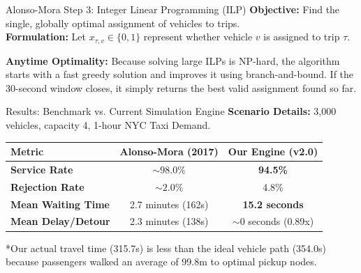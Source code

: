 \documentclass{beamer}
\begin{document}
\begin{frame}{Alonso-Mora Step 3: Integer Linear Programming (ILP)}
  \textbf{Objective:} Find the single, globally optimal assignment of vehicles to trips. \\
  \textbf{Formulation:} Let $x_{\tau,v} \in \{0, 1\}$ represent whether vehicle $v$ is assigned to trip $\tau$.
  \vspace{0.2cm}
  
  \begin{center}
  \end{center}
  \vspace{0.3cm}
  \textbf{Anytime Optimality:} Because solving large ILPs is NP-hard, the algorithm starts with a fast greedy solution and improves it using branch-and-bound. If the 30-second window closes, it simply returns the best valid assignment found so far.
\end{frame}

\begin{frame}{Results: Benchmark vs. Current Simulation Engine}
  \textbf{Scenario Details:} 3,000 vehicles, capacity 4, 1-hour NYC Taxi Demand.
  \vspace{0.3cm}
  
  \begin{table}[]
      \centering
      \begin{tabular}{|l|c|c|}
      \hline
      \textbf{Metric} & \textbf{Alonso-Mora (2017)} & \textbf{Our Engine (v2.0)} \\ \hline
      \textbf{Service Rate} & $\sim 98.0\%$ & \textbf{94.5\%} \\ \hline
      \textbf{Rejection Rate} & $\sim 2.0\%$ & 4.8\% \\ \hline
      \textbf{Mean Waiting Time} & 2.7 minutes (162s) & \textbf{15.2 seconds} \\ \hline
      \textbf{Mean Delay/Detour} & 2.3 minutes (138s) & $\sim 0$ seconds (0.89x) \\ \hline
      \end{tabular}
  \end{table}
  \vspace{0.1cm}
  \footnotesize{*Our actual travel time (315.7s) is less than the ideal vehicle path (354.0s) because passengers walked an average of 99.8m to optimal pickup nodes.}
\end{frame}
\end{document}
